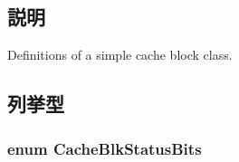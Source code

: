 \subsection{説明}
Definitions of a simple cache block class. 

\subsection{列挙型}
\hypertarget{blk_8hh_aba0f973471df5d3edb783ecd63fe51f7}{
\subsubsection[{CacheBlkStatusBits}]{\setlength{\rightskip}{0pt plus 5cm}enum {\bf CacheBlkStatusBits}}}
\label{blk_8hh_aba0f973471df5d3edb783ecd63fe51f7}
